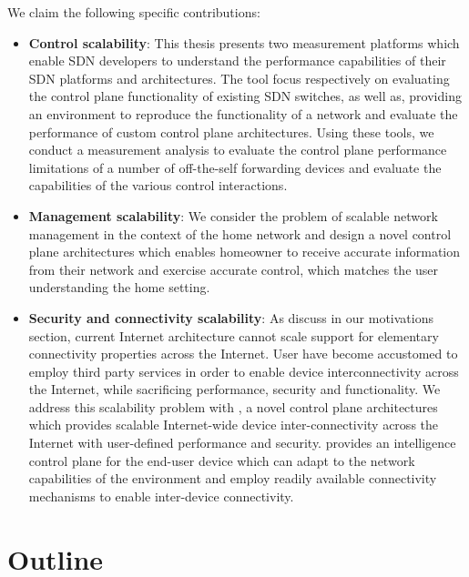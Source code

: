 We claim the following specific contributions:

\begin{itemize}
  \item \textbf{Control scalability}: This thesis presents two measurement
        platforms which enable SDN developers to understand the performance
        capabilities of their SDN platforms and architectures. The tool focus
        respectively on evaluating the control plane functionality of existing
        SDN switches, as well as, providing an environment to reproduce the
        functionality of a network and evaluate the performance of custom
        control plane architectures. Using these tools, we conduct a measurement
        analysis to evaluate the control plane performance limitations of a
        number of off-the-self forwarding devices and evaluate the capabilities
        of the various control interactions.  
  \item \textbf{Management scalability}: We consider the problem of scalable
        network management in the context of the home network and design a novel
        control plane architectures which enables homeowner to receive accurate
        information from their network and exercise accurate control, which
        matches the user understanding the home setting. 
  \item \textbf{Security and connectivity scalability}: As discuss in our
        motivations section, current Internet architecture cannot scale support
        for elementary connectivity properties across the Internet. User have
        become accustomed to employ third party services in order to enable
        device interconnectivity across the Internet, while sacrificing
        performance, security and functionality. We address this scalability
        problem with \signpost, a novel control plane architectures which
        provides scalable Internet-wide device inter-connectivity across the
        Internet with user-defined performance and security. \signpost provides
        an intelligence control plane for the end-user device which can adapt to
        the network capabilities of the environment and employ readily available
        connectivity mechanisms to enable inter-device connectivity. 
\end{itemize}

\section{Outline} \label{sec:intro:outline}

